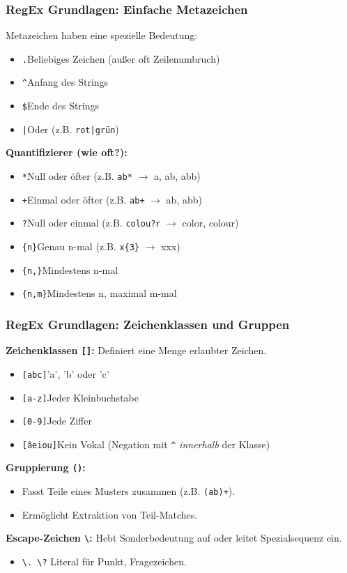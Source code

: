 \documentclass[aspectratio=169]{beamer} %
\begin{document}
\begin{frame}[fragile]
\frametitle{RegEx Grundlagen: Einfache Metazeichen}
Metazeichen haben eine spezielle Bedeutung:
\begin{itemize}
    \item \texttt{.}\quad Beliebiges Zeichen (außer oft Zeilenumbruch)
    \item \texttt{\^}\quad Anfang des Strings
    \item \texttt{\$}\quad Ende des Strings
    \item \texttt{|}\quad Oder (z.B. \texttt{rot|grün})
\end{itemize}
\textbf{Quantifizierer (wie oft?):}
\begin{itemize}
    \item \texttt{*}\quad Null oder öfter (z.B. \texttt{ab*} $\rightarrow$ a, ab, abb)
    \item \texttt{+}\quad Einmal oder öfter (z.B. \texttt{ab+} $\rightarrow$ ab, abb)
    \item \texttt{?}\quad Null oder einmal (z.B. \texttt{colou?r} $\rightarrow$ color, colour)
    \item \texttt{\{n\}}\quad Genau n-mal (z.B. \texttt{x\{3\}} $\rightarrow$ xxx)
    \item \texttt{\{n,\}}\quad Mindestens n-mal
    \item \texttt{\{n,m\}}\quad Mindestens n, maximal m-mal
\end{itemize}
\end{frame}

\begin{frame}[fragile]
\frametitle{RegEx Grundlagen: Zeichenklassen und Gruppen}
\textbf{Zeichenklassen \texttt{[]}:} Definiert eine Menge erlaubter Zeichen.
\begin{itemize}
    \item \texttt{[abc]}\quad 'a', 'b' oder 'c'
    \item \texttt{[a-z]}\quad Jeder Kleinbuchstabe
    \item \texttt{[0-9]}\quad Jede Ziffer
    \item \texttt{[\^aeiou]}\quad Kein Vokal (Negation mit \texttt{\^} \textit{innerhalb} der Klasse)
\end{itemize}
\textbf{Gruppierung \texttt{()}:}
\begin{itemize}
    \item Fasst Teile eines Musters zusammen (z.B. \texttt{(ab)+}).
    \item Ermöglicht Extraktion von Teil-Matches.
\end{itemize}
\textbf{Escape-Zeichen \texttt{\textbackslash{}}:} Hebt Sonderbedeutung auf oder leitet Spezialsequenz ein.
\begin{itemize}
    \item \texttt{\textbackslash{.} \textbackslash{?}} \quad Literal für Punkt, Fragezeichen.
\end{itemize}
\end{frame}
\end{document}
